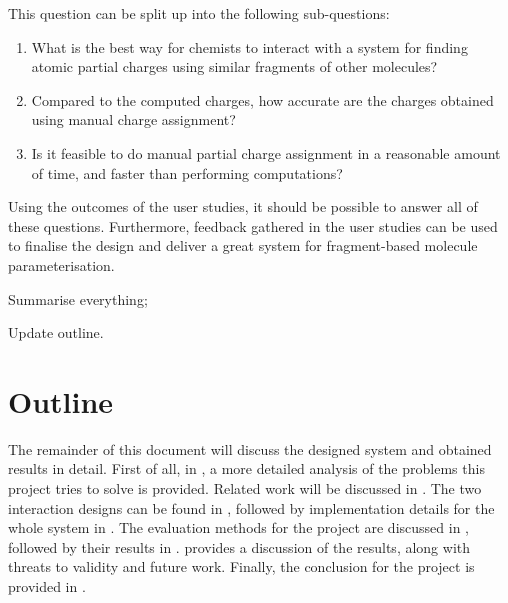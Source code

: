 This question can be split up into the following sub-questions:
\begin{enumerate}
\item What is the best way for chemists to interact with a system for finding atomic partial charges using similar fragments of other molecules?
\item Compared to the computed charges, how accurate are the charges obtained using manual charge assignment?
\item Is it feasible to do manual partial charge assignment in a reasonable amount of time, and faster than performing computations?
\end{enumerate}
Using the outcomes of the user studies, it should be possible to answer all of these questions. Furthermore, feedback gathered in the user studies can be used to finalise the design and deliver a great system for fragment-based molecule parameterisation.

\begin{todo}
\item Summarise everything;
\item Update outline.
\end{todo}

\section{Outline}
The remainder of this document will discuss the designed system and obtained results in detail. First of all, in , a more detailed analysis of the problems this project tries to solve is provided. Related work will be discussed in . The two interaction designs can be found in , followed by implementation details for the whole system in . The evaluation methods for the project are discussed in , followed by their results in .  provides a discussion of the results, along with threats to validity and future work. Finally, the conclusion for the project is provided in .
